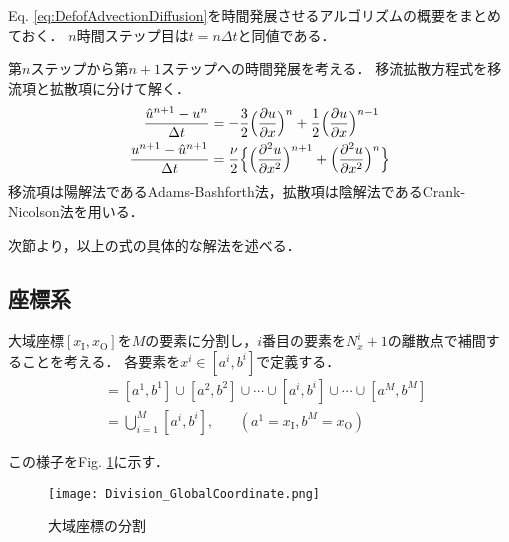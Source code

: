 \documentclass[12pt,a4paper]{jsarticle}
\begin{document}
Eq. \ref{eq:DefofAdvectionDiffusion}を時間発展させるアルゴリズムの概要をまとめておく．
$n$時間ステップ目は$t = n \Delta t$と同値である．

第$n$ステップから第$n+1$ステップへの時間発展を考える．
移流拡散方程式を移流項と拡散項に分けて解く．
\begin{align}
  \frac{\hat{u}^{n+1} -u^n}{\Delta t} &= -\frac{3}{2} \Big( \frac{\partial u}{\partial x} \Big)^n +\frac{1}{2} \Big( \frac{\partial u}{\partial x} \Big)^{n-1}
  \label{eq:TimeIncrementofAdvection} \\
  \frac{u^{n+1} -\hat{u}^{n+1}}{\Delta t} &= \frac{\nu}{2} \Bigl\{ \Big( \frac{\partial^2 u}{\partial x^2} \Big)^{n+1} +\Big( \frac{\partial^2 u}{\partial x^2} \Big)^{n} \Bigr\}
  \label{eq:TimeIncrementofDiffusion}
\end{align}
移流項は陽解法であるAdams-Bashforth法，拡散項は陰解法であるCrank-Nicolson法を用いる．

次節より，以上の式の具体的な解法を述べる．


\subsection{座標系}
\label{sec:Coordinate_System}
大域座標$[x_{\text{I}}, x_{\text{O}}]$を$M$の要素に分割し，$i$番目の要素を$N_{x}^{i}+1$の離散点で補間することを考える．
各要素を$x^i \in [a^i, b^i]$で定義する．
\begin{align}
  [x_{\text{I}}, x_{\text{O}}] &= [a^1, b^1] \cup [a^2, b^2] \cup \cdots \cup [a^i, b^i] \cup \cdots \cup [a^M, b^M] \nonumber \\
  &= \bigcup_{i=1}^{M} [a^i, b^i], ~~~~~~~~(a^1 = x_{\text{I}}, b^M = x_{\text{O}})
  \label{eq:PartitionofGlobalCoor}
\end{align}

この様子をFig. \ref{fig:Division_GlobalCoordinate}に示す．
\begin{figure}[h]
  \centering
  \texttt{[image: Division\_GlobalCoordinate.png]}
  \caption{大域座標の分割}
  \label{fig:Division_GlobalCoordinate}
\end{figure}
\end{document}
